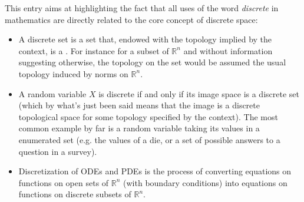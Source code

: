 \documentclass[12pt]{article}
\newcommand{\R}{\mathbb{R}}
\begin{document}
This entry aims at highlighting the fact that all uses of the word \emph{discrete} in mathematics are directly related to the core concept of discrete space:
\begin{itemize}
\item A discrete set is a set that, endowed with the topology implied by the context, is a . For instance for a subset of $\R^n$ and without information suggesting otherwise, the topology on the set would be assumed the usual topology induced by norms on $\R^n$.
\item A random variable $X$ is discrete if and only if its image space is a discrete set (which by what's just been said means that the image is a discrete topological space for some topology specified by the context). The most common example by far is a random variable taking its values in a enumerated set (e.g. the values of a die, or a set of possible answers to a question in a survey).
\item Discretization of ODEs and PDEs is the process of converting equations on functions on open sets of $\R^n$ (with boundary conditions) into equations on functions on discrete subsets of $\R^n$.
\end{itemize}

\end{document}
